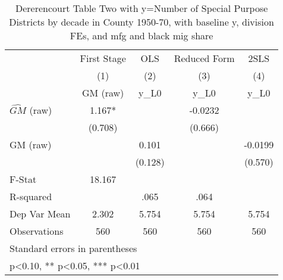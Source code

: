\begin{table}[htbp]\centering
\def\sym#1{\ifmmode^{#1}\else\(^{#1}\)\fi}
\caption{Dererencourt Table Two with y=Number of Special Purpose Districts by decade in County 1950-70, with baseline y, division FEs, and mfg and black mig share}
\begin{tabular}{l*{4}{c}}
\toprule
                    & First Stage   &         OLS   &Reduced Form   &        2SLS   \\
                    &\multicolumn{1}{c}{(1)}&\multicolumn{1}{c}{(2)}&\multicolumn{1}{c}{(3)}&\multicolumn{1}{c}{(4)}\\
                    &\multicolumn{1}{c}{GM  (raw)}&\multicolumn{1}{c}{y\_L0}&\multicolumn{1}{c}{y\_L0}&\multicolumn{1}{c}{y\_L0}\\
\midrule
$\hat{GM}$ (raw)    &       1.167*  &               &     -0.0232   &               \\
                    &     (0.708)   &               &     (0.666)   &               \\
\addlinespace
GM  (raw)           &               &       0.101   &               &     -0.0199   \\
                    &               &     (0.128)   &               &     (0.570)   \\
\midrule
F-Stat              &      18.167   &               &               &               \\
R-squared           &               &        .065   &        .064   &               \\
Dep Var Mean        &       2.302   &       5.754   &       5.754   &       5.754   \\
Observations        &         560   &         560   &         560   &         560   \\
\bottomrule
\multicolumn{5}{l}{\footnotesize Standard errors in parentheses}\\
\multicolumn{5}{l}{\footnotesize * p<0.10, ** p<0.05, *** p<0.01}\\
\end{tabular}
\end{table}
